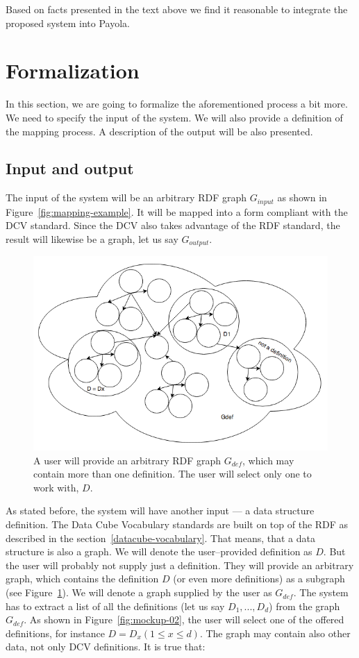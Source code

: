 Based on facts presented in the text above we find it reasonable to integrate 
the proposed system into Payola.

\section{Formalization}

In this section, we are going to formalize the aforementioned process a bit 
more. We need to specify the input of the system. We will also 
provide a definition of the mapping process. A description of the output will be 
also presented.

\subsection{Input and output}

The input of the system will be an arbitrary RDF graph $G_{input}$ as shown
in Figure~\ref{fig:mapping-example}. It will be mapped into a form compliant
with the DCV standard. Since the DCV also takes advantage of the RDF standard,
the result will likewise be a graph, let us say $G_{output}$.

\begin{figure}
	\centering
	\includegraphics[width=120mm]{img/definition-in-graph.png}
	\caption{A user will provide an arbitrary RDF graph $G_{def}$, which may contain more than one definition. The user will select only one to work with, $D$.}
	\label{fig:definition-in-graph}
\end{figure}

As stated before, the system will have another input --- a data structure 
definition. The Data Cube Vocabulary standards are built on top of the RDF as described in the 
section~\ref{datacube-vocabulary}. That means, that a data structure is also a 
graph. We will denote the user--provided definition as $D$. But the user will probably not 
supply just a definition. They will provide an arbitrary graph, which contains the definition $D$ 
(or even more definitions) as a subgraph (see Figure~\ref{fig:definition-in-graph}).
We will denote a graph
supplied by the user as $G_{def}$. The system has to extract a list of all the definitions
(let us say $D_1, ..., D_d$) from the graph $G_{def}$. As shown in Figure~\ref{fig:mockup-02},
the user will select one of the offered definitions, for instance $D = D_x (1 \leq x \leq d)$.
The graph may contain also other data, not only DCV definitions. It is true 
that:\\

